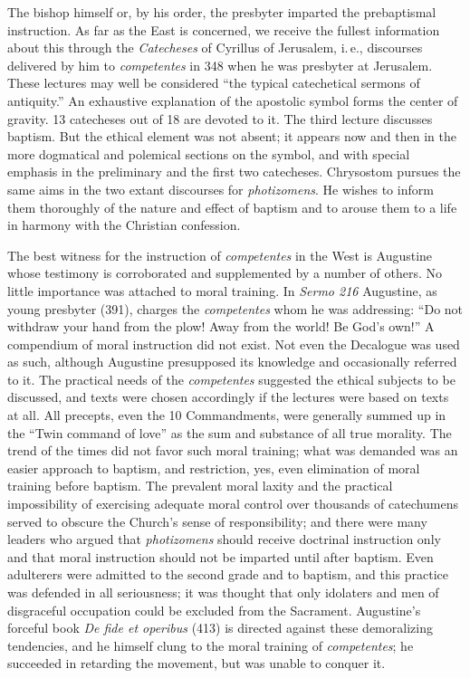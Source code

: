 The bishop himself or, by his order, the presbyter imparted the prebaptismal instruction. As far as the East is concerned, we receive the fullest information about this through the \emph{Catecheses} of Cyrillus of Jerusalem, i.\,e., discourses delivered by him to \emph{competentes} in 348 when he was presbyter at Jerusalem. These lectures may well be considered “the typical catechetical sermons of antiquity.” An exhaustive explanation of the apostolic symbol forms the center of gravity. 13 catecheses out of 18 are devoted to it. The third lecture discusses baptism. But the ethical element was not absent; it appears now and then in the more dogmatical and polemical sections on the symbol, and with special emphasis in the preliminary and the first two catecheses. Chrysostom pursues the same aims in the two extant discourses for \emph{photizomens}. He wishes to inform them thoroughly of the nature and effect of baptism and to arouse them to a life in harmony with the Christian confession.

The best witness for the instruction of \emph{competentes} in the West is Augustine whose testimony is corroborated and supplemented by a number of others. No little importance was attached to moral training. In \emph{Sermo 216} Augustine, as young presbyter (391), charges the \emph{competentes} whom he was addressing: “Do not withdraw your hand from the plow! Away from the world! Be God’s own!” A compendium of moral instruction did not exist. Not even the Decalogue was used as such, although Augustine presupposed its knowledge and occasionally referred to it. The practical needs of the \emph{competentes} suggested the ethical subjects to be discussed, and texts were chosen accordingly if the lectures were based on texts at all. All precepts, even the 10 Commandments, were generally summed up in the “Twin command of love” as the sum and substance of all true morality. The trend of the
times did not favor such moral training; what was demanded was an easier approach to baptism, and restriction, yes, even elimination of moral training before baptism. The prevalent moral laxity and the practical impossibility of exercising adequate moral control over thousands of catechumens served to obscure the Church’s sense of responsibility; and there were many leaders who argued that \emph{photizomens} should receive doctrinal instruction only and that moral instruction should not be imparted until after baptism. Even adulterers were admitted to the second grade and to baptism, and this practice was defended in all seriousness; it was thought that only idolaters and men of disgraceful occupation could be excluded from the Sacrament. Augustine’s forceful book \emph{De fide et operibus} (413) is directed against these demoralizing tendencies, and he himself clung to the moral training of \emph{competentes}; he succeeded in retarding the movement, but was unable to conquer it.


